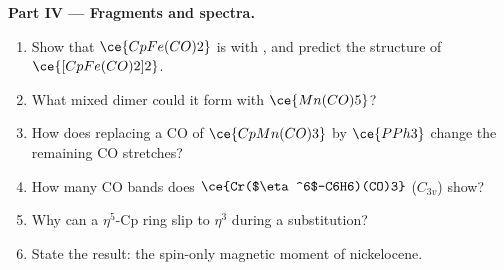 \begin{problem}
\medskip\noindent\textbf{Part IV --- Fragments and spectra.}
\begin{enumerate}[resume]
  \item Show that $\ce{CpFe(CO)2}$ is  with , and predict the structure of
        $\ce{[CpFe(CO)2]2}$.
  \item What mixed dimer could it form with $\ce{Mn(CO)5}$?
  \item How does replacing a CO of $\ce{CpMn(CO)3}$ by $\ce{PPh3}$ change the remaining CO
        stretches?
  \item How many CO bands does $\ce{Cr($\eta^6$-C6H6)(CO)3}$ ($C_{3v}$) show?
  \item Why can a $\eta^5$-Cp ring slip to $\eta^3$ during a substitution?
  \item State the result: the spin-only magnetic moment of nickelocene.
\end{enumerate}
\end{problem}

